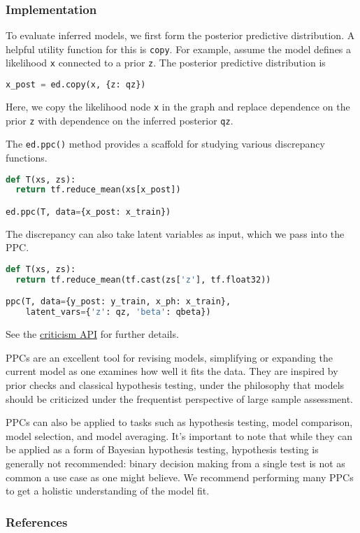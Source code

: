\subsubsection{Implementation}

To evaluate inferred models, we first form the posterior
predictive distribution. A helpful utility function for this is
\texttt{copy}. For example,
assume the model defines a likelihood \texttt{x} connected to a prior
\texttt{z}. The posterior predictive distribution is
\begin{lstlisting}[language=Python]
x_post = ed.copy(x, {z: qz})
\end{lstlisting}
Here, we copy the likelihood node \texttt{x} in the graph and replace dependence
on the prior \texttt{z} with dependence on the inferred posterior \texttt{qz}.

The \texttt{ed.ppc()} method provides a scaffold for studying
various discrepancy functions.
\begin{lstlisting}[language=Python]
def T(xs, zs):
  return tf.reduce_mean(xs[x_post])

ed.ppc(T, data={x_post: x_train})
\end{lstlisting}
The discrepancy can also take latent variables as input, which we pass
into the PPC.
\begin{lstlisting}[language=Python]
def T(xs, zs):
  return tf.reduce_mean(tf.cast(zs['z'], tf.float32))

ppc(T, data={y_post: y_train, x_ph: x_train},
    latent_vars={'z': qz, 'beta': qbeta})
\end{lstlisting}

See the \href{/api/criticism}{criticism API} for further details.

PPCs are an excellent tool for revising models, simplifying or
expanding the current model as one examines how well it fits the data.
They are inspired by prior checks and classical hypothesis
testing, under the philosophy that models should be
criticized under the frequentist perspective of large sample
assessment.

PPCs can also be applied to tasks such as hypothesis testing, model
comparison, model selection, and model averaging.  It's important to
note that while they can be applied as a form of Bayesian hypothesis
testing, hypothesis testing is generally not recommended: binary
decision making from a single test is not as common a use case as one
might believe. We recommend performing many PPCs to get a holistic
understanding of the model fit.

\subsubsection{References}\label{references}

